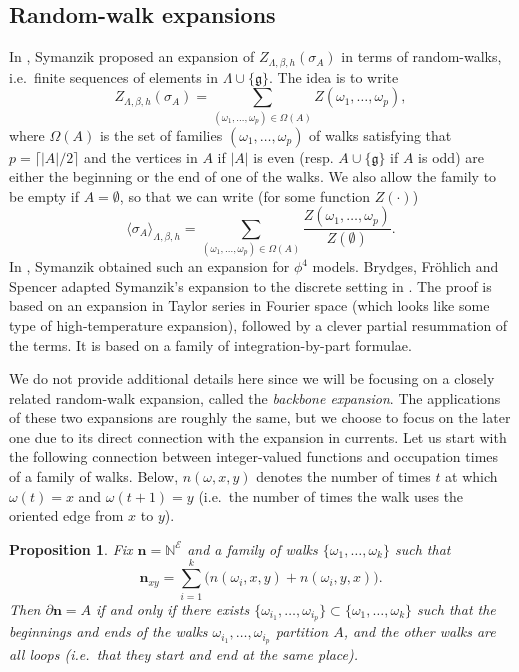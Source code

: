 \documentclass[a4paper,oneside,11pt]{article}
\newtheorem{proposition}[theorem]{Proposition}
\newcommand{\ee}{\end{equation}}
\newcommand{\be}{\begin{equation}}
\begin{document}
\subsection{Random-walk expansions}$ $\\
In \cite{Sym66}, Symanzik proposed an expansion of $Z_{\Lambda,\beta,h}(\sigma_A)$ in terms of random-walks, i.e.~finite sequences of elements in $\Lambda\cup\{\mathfrak g\}$. The idea is to write 
\be\nonumber
Z_{\Lambda,\beta,h}(\sigma_A)=\sum_{(\omega_1,\dots,\omega_p)\in \Omega(A)}Z(\omega_1,\dots,\omega_p),
\ee
where $\Omega(A)$ is the set of families $(\omega_1,\dots,\omega_p)$ of walks satisfying that $p=\lceil |A|/2\rceil$ and the vertices in $A$ if $|A|$ is even (resp. $A\cup\{\mathfrak g\}$ if $A$ is odd) are either the beginning or the end of one of the walks. We also allow the family to be empty if $A=\emptyset$, so that we can write (for some function $Z(\cdot)$)
\be\label{eq:80}
\langle\sigma_A\rangle_{\Lambda,\beta,h}=\displaystyle\sum_{(\omega_1,\dots,\omega_p)\in\Omega(A)}\frac{Z(\omega_1,\dots,\omega_p)}{Z(\emptyset)}.\ee
In \cite{Sym66}, Symanzik obtained such an expansion for $\phi^4$ models.
Brydges, Fr\"ohlich and Spencer adapted Symanzik's expansion to the discrete setting in \cite{BryFroSpe82}. The proof is based on an expansion in Taylor series in Fourier space (which looks like some type of high-temperature expansion), followed by a clever partial resummation of the terms. It is based on a family of integration-by-part formulae. 

We do not provide additional details here since we will be focusing on a closely related random-walk expansion, called the {\em backbone expansion}. The applications of these two expansions are roughly the same, but we choose to focus on the later one due to its direct connection with the expansion in currents.
\medbreak
{} Let us start with the following connection between integer-valued functions and occupation times of a family of walks. Below, $n(\omega,x,y)$ denotes the number of times $t$ at which $\omega(t)=x$ and $\omega(t+1)=y$ (i.e.~the number of times the walk uses the oriented edge from $x$ to $y$).


\begin{proposition}
Fix $\mathbf n=\mathbb N^{\mathcal E}$ and a family of walks $\{\omega_1,\dots,\omega_k\}$ such that 
\be\nonumber
\mathbf n_{xy}=\sum_{i=1}^k \big(n(\omega_i,x,y)+n(\omega_i,y,x)\big).
\ee
Then $\partial\mathbf n=A$ if and only if there exists $\{\omega_{i_1},\dots,\omega_{i_p}\}\subset \{\omega_1,\dots,\omega_k\}$ such that the beginnings and ends of the walks $\omega_{i_1},\dots,\omega_{i_p}$ partition $A$, and the other walks are all loops (i.e.~that they start and end at the same place).
\end{proposition}
\end{document}
